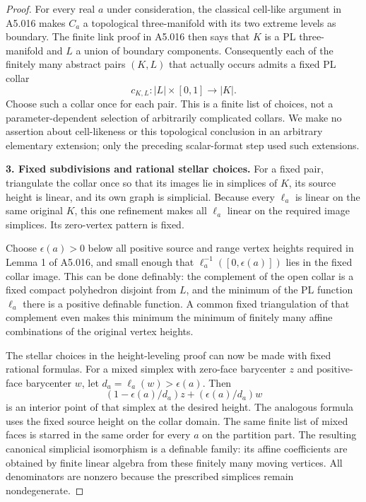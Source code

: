 \begin{proof}
For every real $a$ under consideration, the classical cell-like argument
in A5.016 makes $C_a$ a topological three-manifold with its two extreme
levels as boundary. The finite link proof in A5.016 then says that $K$ is
a PL three-manifold and $L$ a union of boundary components. Consequently
each of the finitely many abstract pairs $(K,L)$ that actually occurs
admits a fixed PL collar
\[
 c_{K,L}:|L|\times[0,1]\longrightarrow|K|.
\]
Choose such a collar once for each pair. This is a finite list of choices,
not a parameter-dependent selection of arbitrarily complicated collars.
We make no assertion about cell-likeness or this topological conclusion in
an arbitrary elementary extension; only the preceding scalar-format step
used such extensions.

\medskip\noindent\textbf{3. Fixed subdivisions and rational stellar choices.}
For a fixed pair, triangulate the collar once so that its images lie in
simplices of $K$, its source height is linear, and its own graph is
simplicial. Because every $\ell_a$ is linear on the same original $K$,
this one refinement makes all $\ell_a$ linear on the required image
simplices. Its zero-vertex pattern is fixed.

Choose $\epsilon(a)>0$ below all positive source and range vertex heights
required in Lemma 1 of A5.016, and small enough that
$\ell_a^{-1}([0,\epsilon(a)])$ lies in the fixed collar image. This can
be done definably: the complement of the open collar is a fixed compact
polyhedron disjoint from $L$, and the minimum of the PL function $\ell_a$
there is a positive definable function. A common fixed triangulation
of that complement even makes this minimum the minimum of finitely many
affine combinations of the original vertex heights.

The stellar choices in the height-leveling proof can now be made with
fixed rational formulas. For a mixed simplex with zero-face barycenter
$z$ and positive-face barycenter $w$, let $d_a=\ell_a(w)>\epsilon(a)$.
Then
\[
 (1-\epsilon(a)/d_a)z+(\epsilon(a)/d_a)w
 \tag{A5.17.4}
\]
is an interior point of that simplex at the desired height. The analogous
formula uses the fixed source height on the collar domain. The same finite
list of mixed faces is starred in the same order for every $a$ on the
partition part. The resulting canonical simplicial isomorphism is a
definable family: its affine coefficients are obtained by finite linear
algebra from these finitely many moving vertices. All denominators are
nonzero because the prescribed simplices remain nondegenerate.


\end{proof}
